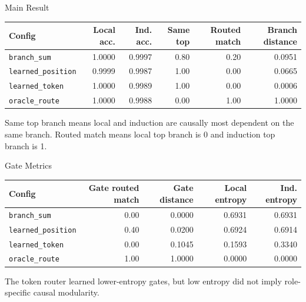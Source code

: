 \documentclass[aspectratio=169]{beamer}
\begin{document}
\begin{frame}{Main Result}
  \begin{center}
  \scriptsize
  \begin{tabular}{lrrrrr}
    \toprule
    Config & Local acc. & Ind. acc. & Same top & Routed match & Branch distance \\
    \midrule
    \texttt{branch\_sum} & 1.0000 & 0.9997 & 0.80 & 0.20 & 0.0951 \\
    \texttt{learned\_position} & 0.9999 & 0.9987 & 1.00 & 0.00 & 0.0665 \\
    \texttt{learned\_token} & 1.0000 & 0.9989 & 1.00 & 0.00 & 0.0006 \\
    \texttt{oracle\_route} & 1.0000 & 0.9988 & 0.00 & 1.00 & 1.0000 \\
    \bottomrule
  \end{tabular}
  \end{center}

  \vspace{0.7em}
  Same top branch means local and induction are causally most dependent on the
  same branch. Routed match means local top branch is 0 and induction top branch is 1.
\end{frame}

\begin{frame}{Gate Metrics}
  \begin{center}
  \scriptsize
  \begin{tabular}{lrrrr}
    \toprule
    Config & Gate routed match & Gate distance & Local entropy & Ind. entropy \\
    \midrule
    \texttt{branch\_sum} & 0.00 & 0.0000 & 0.6931 & 0.6931 \\
    \texttt{learned\_position} & 0.40 & 0.0200 & 0.6924 & 0.6914 \\
    \texttt{learned\_token} & 0.00 & 0.1045 & 0.1593 & 0.3340 \\
    \texttt{oracle\_route} & 1.00 & 1.0000 & 0.0000 & 0.0000 \\
    \bottomrule
  \end{tabular}
  \end{center}

  \vspace{0.7em}
  The token router learned lower-entropy gates, but low entropy did not imply
  role-specific causal modularity.
\end{frame}
\end{document}
